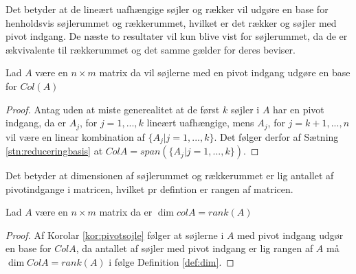 Det betyder at de lineært uafhængige søjler og rækker vil udgøre en base for henholdsvis søjlerummet og rækkerummet, hvilket er det rækker og søjler med pivot indgang. 
De næste to resultater vil kun blive vist for søjlerummet, da de er ækvivalente til rækkerummet og det samme gælder for deres beviser.
\begin{kor}
Lad $A$ være en $n \times m$ matrix da vil søjlerne med en pivot indgang udgøre en base for $Col (A)$
\label{kor:pivotsojle}
\end{kor}
\begin{proof}
Antag uden at miste generealitet at de først $k$ søjler i $A$ har en pivot indgang, da er $A_j$, for $j=1,...,k$ lineært uafhængige, mens $A_j$, for $j = k+1,...,n$ vil være en linear kombination af $\{A_j | j = 1,...,k\}$. 
Det følger derfor af Sætning \ref{stn:reduceringbasis} at $Col A = span(\{A_j| j=1,...,k\})$.
\end{proof}
Det betyder at dimensionen af søjlerummet og rækkerummet er lig antallet af pivotindgange i matricen, hvilket pr defintion er rangen af matricen.
\begin{kor}
Lad $A$ være en $n\times m $ matrix da er $\dim{col A} = rank (A)$
\end{kor}
\begin{proof}
Af Korolar \ref{kor:pivotsojle} følger at søjlerne i $A$ med pivot indgang udgør en base for $Col A$, da antallet af søjler med pivot indgang er lig rangen af $A$ må $\dim{Col A} = rank (A)$ i følge Definition \ref{def:dim}.
\end{proof}


